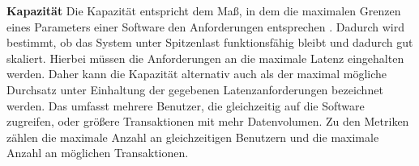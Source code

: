 \noindent
\textbf{Kapazität}\newline
Die Kapazität entspricht dem Maß, in dem die maximalen Grenzen eines Parameters einer Software den Anforderungen entsprechen \cite{ISOIEC.}. Dadurch wird bestimmt, ob das System unter Spitzenlast funktionsfähig bleibt und dadurch gut skaliert. Hierbei müssen die Anforderungen an die maximale Latenz eingehalten werden. Daher kann die Kapazität alternativ auch als der maximal mögliche Durchsatz unter Einhaltung der gegebenen Latenzanforderungen bezeichnet werden. Das umfasst mehrere Benutzer, die gleichzeitig auf die Software zugreifen, oder größere Transaktionen mit mehr Datenvolumen. Zu den Metriken zählen die maximale Anzahl an gleichzeitigen Benutzern und die maximale Anzahl an möglichen Transaktionen.\cite{Barbacci.1995}